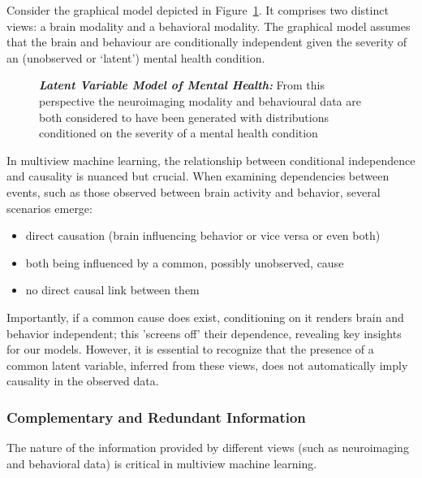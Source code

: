 Consider the graphical model depicted in Figure~\ref{fig:mentalhealthselfsupervised}.
It comprises two distinct \gls{views}: a brain modality and a behavioral modality.
The graphical model assumes that the brain and behaviour are conditionally independent given the severity of an (unobserved or `latent') mental health condition.

\begin{figure}
    \centering
    \caption[Latent Variable Model of Mental Health]{\textit{\textbf{Latent Variable Model of Mental Health:}} From this perspective the neuroimaging modality and behavioural data are both considered to have been generated with distributions conditioned on the severity of a mental health condition}\label{fig:mentalhealthselfsupervised}
\end{figure}

In multiview machine learning, the relationship between conditional independence and causality is nuanced but crucial.
When examining dependencies between events, such as those observed between brain activity and behavior, several scenarios emerge:

\begin{itemize}
    \item direct causation (brain influencing behavior or vice versa or even both)
    \item both being influenced by a common, possibly unobserved, cause
    \item no direct causal link between them
\end{itemize}

Importantly, if a common cause does exist, conditioning on it renders brain and behavior independent; this 'screens off' their dependence, revealing key insights for our models\cite{reichenbach1956direction}.
However, it is essential to recognize that the presence of a common latent variable, inferred from these \gls{views}, does not automatically imply causality in the observed data.

\subsubsection{Complementary and Redundant Information}
The nature of the information provided by different \gls{views} (such as neuroimaging and behavioral data) is critical in multiview machine learning.

